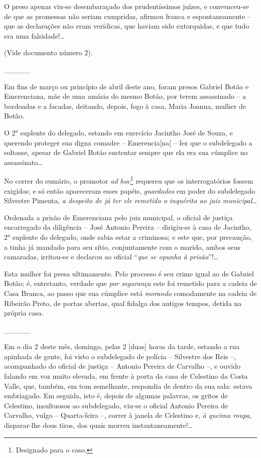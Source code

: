 O preso apenas viu-se desembaraçado dos prudentíssimos juízes, e
convenceu-se de que as promessas não seriam cumpridas, afirmou franca e
espontaneamente -- que as declarações não eram verídicas, que haviam
sido extorquidas, e que tudo era uma falsidade!\ldots{}

(Vide documento número 2).

\_\_\_\_\_

Em fins de março ou princípio de abril deste ano, foram presos Gabriel
Botão e Emerenciana, mãe de uma amásia do mesmo Botão, por terem
assassinado -- a bordoadas e a facadas, deitando, depois, fogo à casa,
Maria Joanna, mulher de Botão.

O 2° suplente do delegado, estando em exercício Jacintho José de Souza,
e querendo proteger sua digna comadre -- Emerencia{[}na{]} -- fez que o
subdelegado a soltasse, apesar de Gabriel Botão sustentar sempre que ela
era sua cúmplice no assassinato\ldots{}

\noindent\dotfill{}

No correr do sumário, o promotor \emph{ad hoc}\footnote{ Designado para
  o caso.} requereu que os interrogatórios fossem exigidos; e só então
apareceram esses papéis, \emph{guardados} em poder do subdelegado
Silvestre Pimenta, \emph{a despeito de já ter ele remetido o inquérito
ao juiz municipal}\ldots{}

Ordenada a prisão de Emerenciana pelo juiz municipal, o oficial de
justiça encarregado da diligência -- José Antonio Pereira -- dirigiu-se
à casa de Jacintho, 2° suplente do delegado, onde sabia estar a
criminosa; e este que, por precaução, a tinha já mandado para seu sítio,
conjuntamente com o marido, ambos seus camaradas, irritou-se e declarou
ao oficial ``\emph{que se opunha à prisão}''!\ldots{}

Esta mulher foi presa ultimamente. Pelo processo é seu crime igual ao de
Gabriel Botão; é, entretanto, verdade que \emph{por segurança} este foi
remetido para a cadeia de Casa Branca, ao passo que sua cúmplice está
\emph{morando} comodamente na cadeia de Ribeirão Preto, de portas
abertas, qual fidalga dos antigos tempos, detida na própria casa.

\_\_\_\_\_

Em o dia 2 deste mês, domingo, pelas 2 {[}duas{]} horas da tarde,
estando a rua apinhada de gente, foi visto o subdelegado de polícia --
Silvestre dos Reis --, acompanhado do oficial de justiça -- Antonio
Pereira de Carvalho --, e ouvido falando em voz muito elevada, em frente
à porta da casa de Celestino da Costa Valle, que, também, em tom
semelhante, respondia de dentro da sua sala: estava embriagado. Em
seguida, isto é, depois de algumas palavras, os gritos de Celestino,
insultuosos ao subdelegado, viu-se o oficial Antonio Pereira de
Carvalho, vulgo -- Quarta-feira --, correr à janela de Celestino e,
\emph{à queima roupa}, disparar-lhe dous tiros, dos quais morreu
instantaneamente!\ldots{}

